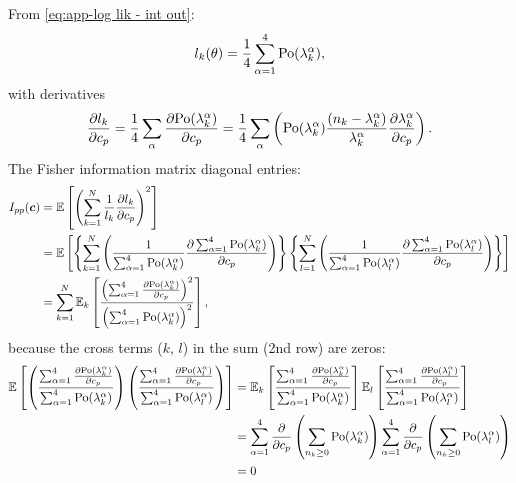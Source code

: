 From \autoref{eq:app-log lik - int out}:
%
\begin{equation}
	l_k(\theta)=\frac{1}{4}\sum_{\alpha=1}^4\mathrm{Po}(\lambda_k^\alpha),
\end{equation}
%
with derivatives 
%
\begin{equation}
	\frac{\partial l_k}{\partial c_p}=\frac{1}{4}\sum_\alpha\frac{\partial\mathrm{Po}(\lambda_k^\alpha)}{\partial c_p}=\frac{1}{4}\sum_\alpha\left(\mathrm{Po}(\lambda_k^\alpha)\frac{(n_k-\lambda_k^\alpha)}{\lambda_k^\alpha}\frac{\partial\lambda_k^\alpha}{\partial c_p}\right).
\end{equation}
%
The Fisher information matrix diagonal entries:
%
\begin{alignat}{2}
	I_{pp}(\bm{c}) & =\mathbb{E}\left[\left(\sum_{k=1}^N\frac{1}{l_k}\frac{\partial l_k}{\partial c_p}\right)^2\right] \\
 	& =\mathbb{E}\left[\left\{ \sum_{k=1}^N\left(\frac{1}{\sum_{\alpha=1}^4\mathrm{Po}(\lambda_k^\alpha)}\frac{\partial\sum_{\alpha=1}^4\mathrm{Po}(\lambda_k^\alpha)}{\partial c_p}\right)\right\} \left\{ \sum_{l=1}^N\left(\frac{1}{\sum_{\alpha=1}^4\mathrm{Po}(\lambda_l^\alpha)}\frac{\partial\sum_{\alpha=1}^4\mathrm{Po}(\lambda_l^\alpha)}{\partial c_p}\right)\right\} \right] \\
	& =\sum_{k=1}^N\mathbb{E}_k\left[\frac{\left(\sum_{\alpha=1}^4\frac{\partial\mathrm{Po}(\lambda_k^\alpha)}{\partial c_p}\right)^2}{\left(\sum_{\alpha=1}^4\mathrm{Po}(\lambda_k^\alpha)\right)^2}\right],
	\label{eq:app-Fisher Info Integrated Out - diagonal entries}
\end{alignat}
%
because the cross terms ($k,\, l$) in the sum (2nd row) are zeros: 
%
\begin{alignat}{2}
	\mathbb{E}\left[\left(\frac{\sum_{\alpha=1}^4\frac{\partial\mathrm{Po}(\lambda_k^\alpha)}{\partial c_p}}{\sum_{\alpha=1}^4\mathrm{Po}(\lambda_k^\alpha)}\right)\left(\frac{\sum_{\alpha=1}^4\frac{\partial\mathrm{Po}(\lambda_l^\alpha)}{\partial c_p}}{\sum_{\alpha=1}^4\mathrm{Po}(\lambda_l^\alpha)}\right)\right] 
	& =\mathbb{E}_k\left[\frac{\sum_{\alpha=1}^4\frac{\partial\mathrm{Po}(\lambda_k^\alpha)}{\partial c_p}}{\sum_{\alpha=1}^4\mathrm{Po}(\lambda_k^\alpha)}\right]\mathbb{E}_l\left[\frac{\sum_{\alpha=1}^4\frac{\partial\mathrm{Po}(\lambda_l^\alpha)}{\partial c_p}}{\sum_{\alpha=1}^4\mathrm{Po}(\lambda_l^\alpha)}\right]\\
 	& =\sum_{\alpha=1}^4\frac{\partial}{\partial c_p}\left(\sum_{n_k\geq0}\mathrm{Po}(\lambda_k^\alpha)\right)\sum_{\alpha=1}^4\frac{\partial}{\partial c_p}\left(\sum_{n_k\geq0}\mathrm{Po}(\lambda_l^\alpha)\right)\\
 	& =0
\end{alignat}


